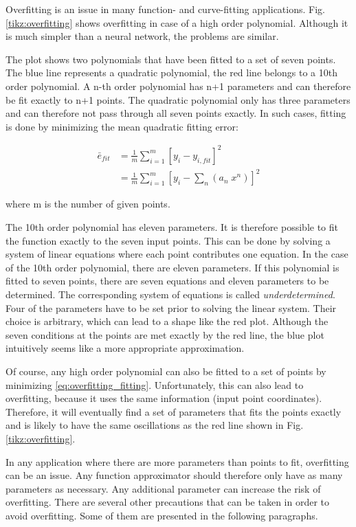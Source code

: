 Overfitting is an issue in many function- and curve-fitting applications. Fig. \ref{tikz:overfitting} shows overfitting in case of a high order polynomial. Although it is much simpler than a neural network, the problems are similar.

The plot shows two polynomials that have been fitted to a set of seven points. The blue line represents a quadratic polynomial, the red line belongs to a 10th order polynomial. A n-th order polynomial has n+1 parameters and can therefore be fit exactly to n+1 points. The quadratic polynomial only has three parameters and can therefore not pass through all seven points exactly. In such cases, fitting is done by minimizing the mean quadratic fitting error: 

\begin{align}
\bar{e}_{fit}&=\frac{1}{m}\sum_{i=1}^{m}[y_i-y_{i,fit}]^2 \\
&=\frac{1}{m}\sum_{i=1}^{m}[y_i-\sum_n (a_n\;x^n)]^2
\label{eq:overfitting_fitting}
\end{align}

where m is the number of given points. 

The 10th order polynomial has eleven parameters. It is therefore possible to fit the function exactly to the seven input points. This can be done by solving a system of linear equations where each point contributes one equation. In the case of the 10th order polynomial, there are eleven parameters. If this polynomial is fitted to seven points, there are seven equations and eleven parameters to be determined. The corresponding system of equations is called \textit{underdetermined}. Four of the parameters have to be set prior to solving the linear system. Their choice is arbitrary, which can lead to a shape like the red plot. Although the seven conditions at the points are met exactly by the red line, the blue plot intuitively seems like a more appropriate approximation.

Of course, any high order polynomial can also be fitted to a set of points by minimizing \ref{eq:overfitting_fitting}. Unfortunately, this can also lead to overfitting, because it uses the same information (input point coordinates). Therefore, it will eventually find a set of parameters that fits the points exactly and is likely to have the same oscillations as the red line shown in Fig. \ref{tikz:overfitting}.

In any application where there are more parameters than points to fit, overfitting can be an issue. Any function approximator should therefore only have as many parameters as necessary. Any additional parameter can increase the risk of overfitting. There are several other precautions that can be taken in order to avoid overfitting. Some of them are presented in the following paragraphs. \bigbreak

